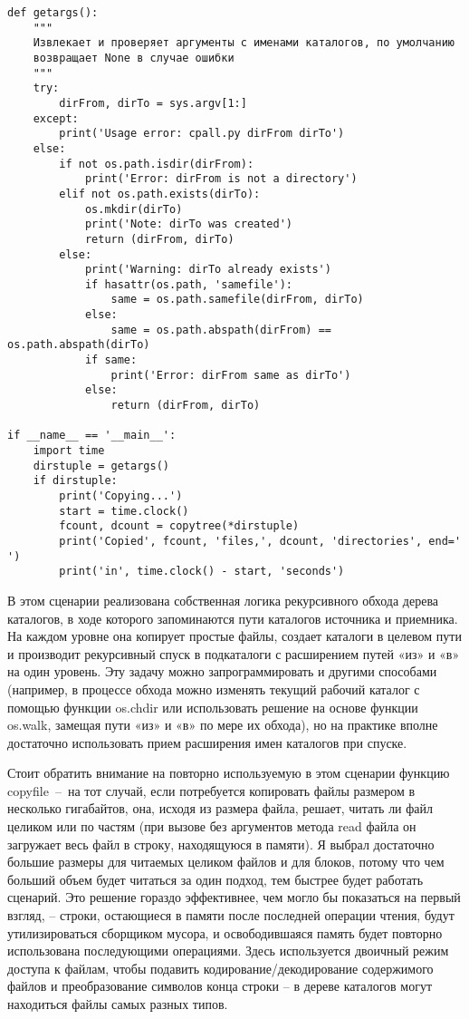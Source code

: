 \documentclass[12pt]{article}
\begin{document}
\begin{verbatim}
def getargs():
    """
    Извлекает и проверяет аргументы с именами каталогов, по умолчанию
	возвращает None в случае ошибки
    """
    try:
        dirFrom, dirTo = sys.argv[1:]
    except:
        print('Usage error: cpall.py dirFrom dirTo')
    else:
        if not os.path.isdir(dirFrom):
            print('Error: dirFrom is not a directory')
        elif not os.path.exists(dirTo):
            os.mkdir(dirTo)
            print('Note: dirTo was created')
            return (dirFrom, dirTo)
        else:
            print('Warning: dirTo already exists')
            if hasattr(os.path, 'samefile'):
                same = os.path.samefile(dirFrom, dirTo)
            else:
                same = os.path.abspath(dirFrom) == os.path.abspath(dirTo)
            if same:
                print('Error: dirFrom same as dirTo')
            else:
                return (dirFrom, dirTo)

if __name__ == '__main__':
    import time
    dirstuple = getargs()
    if dirstuple:
        print('Copying...')
        start = time.clock()
        fcount, dcount = copytree(*dirstuple)
        print('Copied', fcount, 'files,', dcount, 'directories', end=' ')
        print('in', time.clock() - start, 'seconds')
\end{verbatim}

В этом сценарии реализована собственная логика рекурсивного обхода
дерева каталогов, в ходе которого запоминаются пути каталогов источника и приемника. На каждом уровне она копирует простые файлы,
создает каталоги в целевом пути и производит рекурсивный спуск в подкаталоги с расширением путей «из» и «в» на один уровень. Эту задачу
можно запрограммировать и другими способами (например, в процессе
обхода можно изменять текущий рабочий каталог с помощью функции
os.chdir или использовать решение на основе функции os.walk, замещая
пути «из» и «в» по мере их обхода), но на практике вполне достаточно
использовать прием расширения имен каталогов при спуске.

Стоит обратить внимание на повторно используемую в этом сценарии функцию \\ copyfile~–~на 
тот случай, если потребуется копировать файлы размером в несколько гигабайтов, она, исходя из размера файла, решает,
читать ли файл целиком или по частям (при вызове без
аргументов метода read файла он загружает весь файл в строку, находящуюся в памяти). Я выбрал достаточно большие размеры для читаемых целиком файлов и для блоков, потому что чем больший объем
будет читаться за один подход, тем быстрее будет работать сценарий.
Это решение гораздо эффективнее, чем могло бы показаться на первый
взгляд, – строки, остающиеся в памяти после последней операции чтения, будут утилизироваться сборщиком мусора, и освободившаяся память будет повторно использована последующими операциями. Здесь используется двоичный режим доступа к файлам, чтобы подавить кодирование/декодирование содержимого файлов и преобразование символов конца строки – в дереве каталогов могут находиться
файлы самых разных типов.
\end{document}

